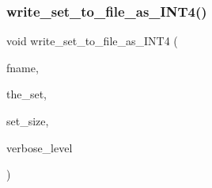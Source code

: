\subsubsection{\texorpdfstring{write\+\_\+set\+\_\+to\+\_\+file\+\_\+as\+\_\+\+I\+N\+T4()}{write\_set\_to\_file\_as\_INT4()}}
{\footnotesize\ttfamily void write\+\_\+set\+\_\+to\+\_\+file\+\_\+as\+\_\+\+I\+N\+T4 (\begin{DoxyParamCaption}\item[{const \mbox{\hyperlink{galois_8h_ab6cc7b4aeb6ea31aba2b3fbfc83ff5e6}{B\+Y\+TE}} $\ast$}]{fname,  }\item[{\mbox{\hyperlink{galois_8h_a09fddde158a3a20bd2dcadb609de11dc}{I\+NT}} $\ast$}]{the\+\_\+set,  }\item[{\mbox{\hyperlink{galois_8h_a09fddde158a3a20bd2dcadb609de11dc}{I\+NT}}}]{set\+\_\+size,  }\item[{\mbox{\hyperlink{galois_8h_a09fddde158a3a20bd2dcadb609de11dc}{I\+NT}}}]{verbose\+\_\+level }\end{DoxyParamCaption})}

